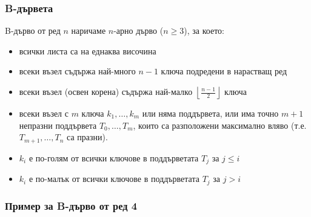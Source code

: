 \documentclass[alsotrans]{beamerswitch}
\newcommand{\bnode}[5][]{
  \matrix[bnodemtx,nodes={text width=1.6em},#1]
  (#2data) { #3 \& #4 \& #5\\ };
  \matrix[bnodemtx,nodes={text width=1.2em},below=-2*\pgflinewidth of #2data.south]
  (#2next) { \&\&\& \\};
}
\begin{document}
\begin{frame}
  \frametitle{B-дървета}
  \begin{definition}[B-дърво]
    B-дърво от ред $n$ наричаме $n$-арно дърво ($n \geq 3$), за което:
    \begin{itemize}
    \item всички листа са на еднаква височина
    \item всеки възел съдържа най-много $n-1$ ключа подредени в нарастващ ред
    \item всеки възел (освен корена) съдържа най-малко $\left\lfloor\frac {n-1}2\right\rfloor$ ключа
    \item всеки възел с $m$ ключа $k_1,\ldots,k_m$ или няма поддървета, или има точно $m+1$ непразни поддървета $T_0,\ldots, T_m$, които са разположени максимално вляво (т.е. $T_{m+1},\ldots,T_n$ са празни).
    \item $k_i$ е по-голям от всички ключове в поддърветата $T_j$ за $j \leq i$
    \item $k_i$ е по-малък от всички ключове в поддърветата $T_j$ за $j > i$
    \end{itemize}
  \end{definition}
\end{frame}

\begin{frame}
  \frametitle{Пример за B-дърво от ред 4}
  \begin{center}
    \ttfamily
  \end{center}
\end{frame}
\end{document}
